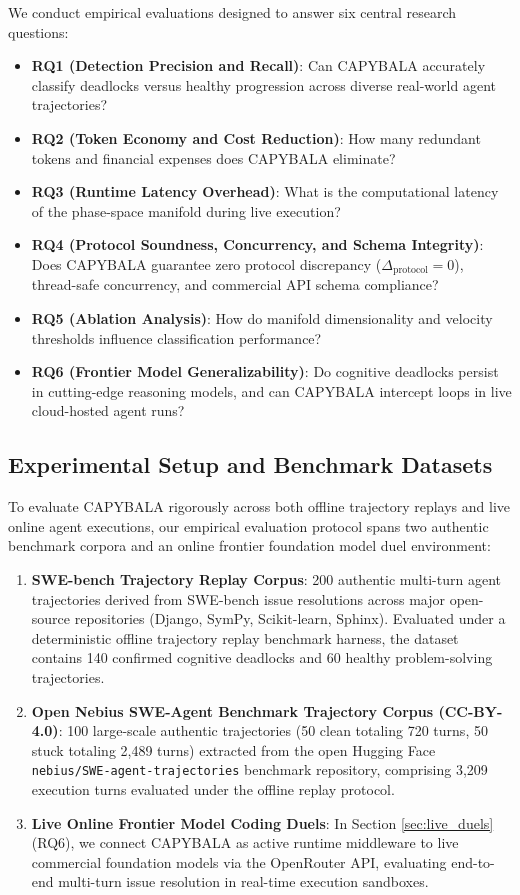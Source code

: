 \documentclass[journal]{IEEEtran}
\begin{document}
We conduct empirical evaluations designed to answer six central research questions:
\begin{itemize}[leftmargin=12pt, topsep=2pt, itemsep=1pt]
    \item \textbf{RQ1 (Detection Precision and Recall)}: Can CAPYBALA accurately classify deadlocks versus healthy progression across diverse real-world agent trajectories?
    \item \textbf{RQ2 (Token Economy and Cost Reduction)}: How many redundant tokens and financial expenses does CAPYBALA eliminate?
    \item \textbf{RQ3 (Runtime Latency Overhead)}: What is the computational latency of the phase-space manifold during live execution?
    \item \textbf{RQ4 (Protocol Soundness, Concurrency, and Schema Integrity)}: Does CAPYBALA guarantee zero protocol discrepancy ($\Delta_{\text{protocol}} = 0$), thread-safe concurrency, and commercial API schema compliance?
    \item \textbf{RQ5 (Ablation Analysis)}: How do manifold dimensionality and velocity thresholds influence classification performance?
    \item \textbf{RQ6 (Frontier Model Generalizability)}: Do cognitive deadlocks persist in cutting-edge reasoning models, and can CAPYBALA intercept loops in live cloud-hosted agent runs?
\end{itemize}

\subsection{Experimental Setup and Benchmark Datasets}
To evaluate CAPYBALA rigorously across both offline trajectory replays and live online agent executions, our empirical evaluation protocol spans two authentic benchmark corpora and an online frontier foundation model duel environment:
\begin{enumerate}[leftmargin=12pt, topsep=2pt, itemsep=1pt]
    \item \textbf{SWE-bench Trajectory Replay Corpus}: 200 authentic multi-turn agent trajectories derived from SWE-bench issue resolutions across major open-source repositories (Django, SymPy, Scikit-learn, Sphinx). Evaluated under a deterministic offline trajectory replay benchmark harness, the dataset contains 140 confirmed cognitive deadlocks and 60 healthy problem-solving trajectories.
    \item \textbf{Open Nebius SWE-Agent Benchmark Trajectory Corpus (CC-BY-4.0)}: 100 large-scale authentic trajectories (50 clean totaling 720 turns, 50 stuck totaling 2,489 turns) extracted from the open Hugging Face \texttt{nebius/SWE-agent-trajectories} benchmark repository, comprising 3,209 execution turns evaluated under the offline replay protocol.
    \item \textbf{Live Online Frontier Model Coding Duels}: In Section \ref{sec:live_duels} (RQ6), we connect CAPYBALA as active runtime middleware to live commercial foundation models via the OpenRouter API, evaluating end-to-end multi-turn issue resolution in real-time execution sandboxes.
\end{enumerate}
\end{document}
